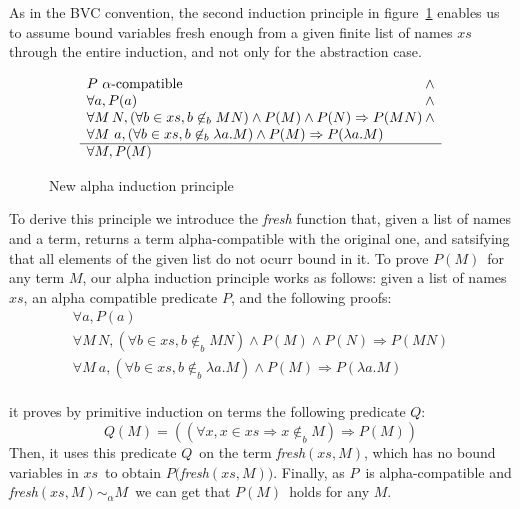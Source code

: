 \documentclass[preprint,10pt]{sigplanconf}
\newcommand{\lam}{\ensuremath{\lambda}}
\newcommand{\alpsym}{\ensuremath{\sim_\alpha}}
\newcommand{\ninb}{\ensuremath{\not\in_b}}
\begin{document}
As in the BVC convention, the second induction principle in figure~\ref{fig:newalphaind} enables us to assume bound variables fresh enough from a given finite list of names $xs$ through the entire induction, and not only for the abstraction case.

\begin{figure}[h]
\[ 
  \begin{array}{l@{\hspace{0.2em}}c}
    P\ \alpha\text{-compatible} & \wedge \\
    \forall a, P(a) & \wedge\\
    \forall M\,N, (\forall b \in xs, b \ninb M N) \wedge P(M) \wedge P(N) \Rightarrow P (M N) & \wedge \\    
    \forall M\ a, (\forall b \in xs, b \ninb \lam a . M) \wedge P(M) \Rightarrow P (\lam a . M) \\
    \hline
    \forall M, P(M)\\
  \end{array}
\]
  \caption{New alpha induction principle}
  \label{fig:newalphaind}
\end{figure}


To derive this principle we introduce the {\sl fresh} function that, given a list of names and a term, returns a term alpha-compatible with the original one, and satsifying that all elements of the given list do not ocurr bound in it. To prove $P(M)$\ for any term $M$, our alpha induction principle  works as follows: given a list of names $xs$, an alpha compatible predicate $P$, and the following proofs:
%
\begin{equation}
  \label{eq:hypothesis}
  \begin{array}{l}
    \forall a, P(a) \\
    \forall M\,N, (\forall b \in xs, b \ninb M N) \wedge P(M) \wedge P(N) \Rightarrow P (M N) \\
    \forall M\ a, (\forall b \in xs, b \ninb \lam a . M) \wedge P(M) \Rightarrow P (\lam a . M) \\
  \end{array}
\end{equation}

\noindent it proves by primitive induction on terms the following predicate $Q$:
\begin{equation}
  \label{eq:prop}
 Q(M) = \left( (\forall x,x  \in xs \Rightarrow x \ninb M) \Rightarrow P(M)  \right)
\end{equation}
%
Then, it uses this predicate $Q$\ on the term {\sl fresh}$(xs,M)$, which has no bound variables in $xs$\ to obtain $P(${\sl fresh}$(xs,M))$. Finally, as $P$\ is alpha-compatible and {\sl fresh}$(xs,M) \alpsym M$\ we can get that $P(M)$\ holds for any $M$.\\
\end{document}
